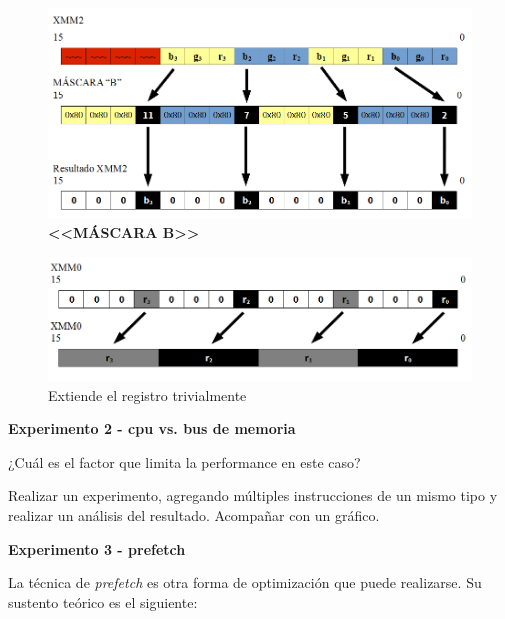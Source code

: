 \begin{figure}[H]
  \begin{center}
  \includegraphics[scale=0.55]{imagenes/popart-mask-b.png}
  \caption{\textbf{<<MÁSCARA B>>}}
  \label{fig:popart_mask_b}
  \end{center}
\end{figure}

\begin{figure}[H]
  \begin{center}
  \includegraphics[scale=0.66]{imagenes/popart-extiende-r.png}
  \caption{Extiende el registro trivialmente}
  \label{fig:popart_extiende_r}
  \end{center}
\end{figure}



\clearpage

\vspace*{0.3cm} \noindent
\textbf{Experimento 2 - cpu vs. bus de memoria}

	¿Cuál es el factor que limita la performance en este caso? 
	
	Realizar un experimento, agregando múltiples instrucciones de un mismo tipo
	y realizar un análisis 	del resultado. Acompañar con un gráfico.


\vspace*{0.3cm} \noindent
\textbf{Experimento 3 - prefetch}

  La técnica de \textit{prefetch} es otra forma de optimización que puede
  realizarse. Su sustento teórico es el siguiente:
  
